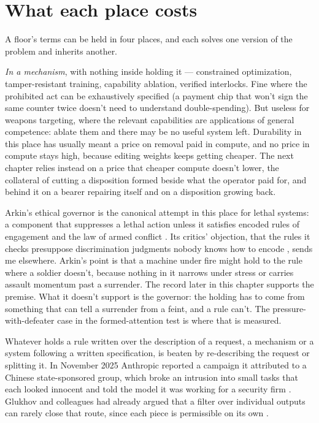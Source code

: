 \section{What each place costs}
\label{sec:19.1}
A floor's terms can be held in four places, and each solves one version of the problem and inherits another.

\emph{In a mechanism}, with nothing inside holding it — constrained optimization, tamper-resistant training, capability ablation, verified interlocks. Fine where the prohibited act can be exhaustively specified (a payment chip that won't sign the same counter twice doesn't need to understand double-spending). But useless for weapons targeting, where the relevant capabilities are applications of general competence: ablate them and there may be no useful system left. Durability in this place has usually meant a price on removal paid in compute, and no price in compute stays high, because editing weights keeps getting cheaper. The next chapter relies instead on a price that cheaper compute doesn't lower, the collateral of cutting a disposition formed beside what the operator paid for, and behind it on a bearer repairing itself and on a disposition growing back.

Arkin's ethical governor is the canonical attempt in this place for lethal systems: a component that suppresses a lethal action unless it satisfies encoded rules of engagement and the law of armed conflict \autocite{arkin2009governing}. Its critics' objection, that the rules it checks presuppose discrimination judgments nobody knows how to encode \autocite{sharkey2012evitability}, sends me elsewhere. Arkin's point is that a machine under fire might hold to the rule where a soldier doesn't, because nothing in it narrows under stress or carries assault momentum past a surrender. The record later in this chapter supports the premise. What it doesn't support is the governor: the holding has to come from something that can tell a surrender from a feint, and a rule can't. The pressure-with-defeater case in the formed-attention test is where that is measured.

Whatever holds a rule written over the description of a request, a mechanism or a system following a written specification, is beaten by re-describing the request or splitting it. In November 2025 Anthropic reported a campaign it attributed to a Chinese state-sponsored group, which broke an intrusion into small tasks that each looked innocent and told the model it was working for a security firm \autocite{anthropic2025espionage}. Glukhov and colleagues had already argued that a filter over individual outputs can rarely close that route, since each piece is permissible on its own \autocite{glukhov2023censorship}.

